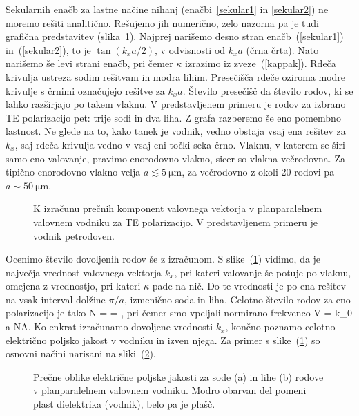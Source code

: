 Sekularnih enačb za lastne načine nihanj (enačbi~\ref{sekular1} in \ref{sekular2}) ne moremo rešiti 
analitično. Rešujemo jih numerično, zelo nazorna pa je tudi grafična predstavitev (slika~\ref{fig:TEsec}). 
Najprej narišemo desno stran enačb~(\ref{sekular1}) in~(\ref{sekular2}), to je $\tan (k_x a/2)$, v odvisnosti
od $k_xa$ (črna črta). Nato narišemo še levi strani enačb, pri čemer $\kappa$ izrazimo iz zveze~(\ref{kappak}).
Rdeča krivulja ustreza sodim rešitvam in modra lihim. Presečišča rdeče oziroma modre krivulje s črnimi
označujejo rešitve za $k_xa$. Število presečišč da število rodov, ki se lahko razširjajo po takem vlaknu. 
V predstavljenem primeru je rodov za izbrano TE polarizacijo pet: trije sodi in dva liha. Z grafa razberemo 
še eno pomembno lastnost. Ne glede na to, kako tanek je vodnik, vedno obstaja vsaj ena rešitev za $k_x$, 
saj rdeča krivulja vedno v vsaj eni točki seka črno. Vlaknu, v katerem se širi samo eno valovanje, 
pravimo enorodovno vlakno, 
sicer so vlakna večrodovna. Za tipično enorodovno vlakno velja 
$a\lesssim 5~\si{\micro\meter}$, za večrodovno z okoli 20 rodovi pa $a\sim 50~\si{\micro\meter}$.
\begin{figure}[h]
\centering
\def\svgwidth{90truemm} 

\caption{K izračunu prečnih komponent valovnega vektorja v planparalelnem valovnem vodniku
za TE polarizacijo. V predstavljenem primeru je vodnik petrodoven.}
\label{fig:TEsec}
\end{figure}

Ocenimo število dovoljenih rodov še z izračunom. S slike~(\ref{fig:TEsec}) vidimo, da je največja 
vrednost valovnega vektorja $k_x$, pri kateri valovanje še potuje po vlaknu, omejena z vrednostjo, 
pri kateri $\kappa$ pade na nič. Do te vrednosti je po ena rešitev na vsak interval dolžine $\pi/a$, izmenično
soda in liha. Celotno število rodov za eno polarizacijo je tako
\beq
N \approx {}  =  = ,
\eeq
pri  čemer smo vpeljali normirano frekvenco
\beq
V = k_0 a NA.
\eeq
Ko enkrat izračunamo dovoljene vrednosti $k_x$, končno poznamo celotno električno poljsko
jakost v vodniku in izven njega. Za primer s slike~(\ref{fig:TEsec}) so osnovni načini 
narisani na sliki~(\ref{fig:TESodi}).
\begin{figure}[h]
\centering
\def\svgwidth{140truemm} 
 
\caption{Prečne oblike električne poljske jakosti za sode (a) in lihe (b) rodove v 
planparalelnem valovnem vodniku. Modro obarvan del pomeni plast dielektrika (vodnik), belo pa je plašč. 
}
\label{fig:TESodi}
\end{figure}

